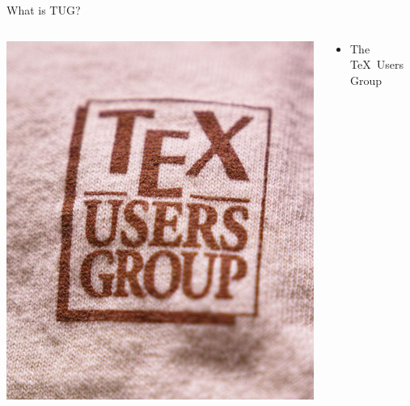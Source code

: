 \documentclass[17pt,dvipdfmx]{beamer}
\begin{document}
\begin{frame}[t]{What is TUG?}
  \bfseries\rmfamily
  \begin{columns}[t]
    \begin{column}{.4\textwidth}
      \vfill
      \hfill\includegraphics[width=.9\textwidth]{tug.jpg}
    \end{column}
    \begin{column}{.7\textwidth}
    \begin{itemize}
      \item  The \TeX\ Users Group \\
    \end{itemize}
    \vfill
    \end{column}
  \end{columns}
\end{frame}
\end{document}
